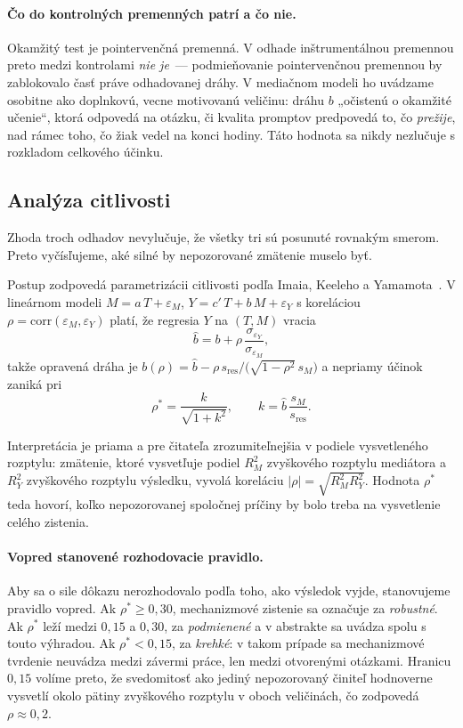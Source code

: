\paragraph{Čo do kontrolných premenných patrí a čo nie.} Okamžitý test je pointervenčná premenná. V odhade inštrumentálnou premennou preto medzi kontrolami \emph{nie je}~--- podmieňovanie pointervenčnou premennou by zablokovalo časť práve odhadovanej dráhy. V mediačnom modeli ho uvádzame osobitne ako doplnkovú, vecne motivovanú veličinu: dráhu $b$ „očistenú o okamžité učenie“, ktorá odpovedá na otázku, či kvalita promptov predpovedá to, čo \emph{prežije}, nad rámec toho, čo žiak vedel na konci hodiny. Táto hodnota sa nikdy nezlučuje s rozkladom celkového účinku.

\subsection{Analýza citlivosti}
\label{subsec:citlivost}

Zhoda troch odhadov nevylučuje, že všetky tri sú posunuté rovnakým smerom. Preto vyčísľujeme, aké silné by nepozorované zmätenie muselo byť.

Postup zodpovedá parametrizácii citlivosti podľa Imaia, Keeleho a Yamamota~\cite{imai2010sensitivity}. V lineárnom modeli $M = a\,T + \varepsilon_M$, $Y = c'\,T + b\,M + \varepsilon_Y$ s koreláciou $\rho = \mathrm{corr}(\varepsilon_M, \varepsilon_Y)$ platí, že regresia $Y$ na $(T, M)$ vracia
\begin{equation}
    \hat{b} = b + \rho\,\frac{\sigma_{\varepsilon_Y}}{\sigma_{\varepsilon_M}},
    \label{eq:sens}
\end{equation}
takže opravená dráha je $b(\rho) = \hat{b} - \rho\,s_{\mathrm{res}}\big/\big(\sqrt{1-\rho^2}\,s_M\big)$ a nepriamy účinok zaniká pri
\begin{equation}
    \rho^\ast = \frac{k}{\sqrt{1+k^2}}, \qquad k = \hat{b}\,\frac{s_M}{s_{\mathrm{res}}} .
\end{equation}

Interpretácia je priama a pre čitateľa zrozumiteľnejšia v podiele vysvetleného rozptylu: zmätenie, ktoré vysvetľuje podiel $R^2_M$ zvyškového rozptylu mediátora a $R^2_Y$ zvyškového rozptylu výsledku, vyvolá koreláciu $|\rho| = \sqrt{R^2_M R^2_Y}$. Hodnota $\rho^\ast$ teda hovorí, koľko nepozorovanej spoločnej príčiny by bolo treba na vysvetlenie celého zistenia.

\paragraph{Vopred stanovené rozhodovacie pravidlo.} Aby sa o sile dôkazu nerozhodovalo podľa toho, ako výsledok vyjde, stanovujeme pravidlo vopred. Ak $\rho^\ast \geq 0{,}30$, mechanizmové zistenie sa označuje za \emph{robustné}. Ak $\rho^\ast$ leží medzi $0{,}15$ a $0{,}30$, za \emph{podmienené} a v abstrakte sa uvádza spolu s touto výhradou. Ak $\rho^\ast < 0{,}15$, za \emph{krehké}: v takom prípade sa mechanizmové tvrdenie neuvádza medzi závermi práce, len medzi otvorenými otázkami. Hranicu $0{,}15$ volíme preto, že svedomitosť ako jediný nepozorovaný činiteľ hodnoverne vysvetlí okolo pätiny zvyškového rozptylu v oboch veličinách, čo zodpovedá $\rho \approx 0{,}2$.

